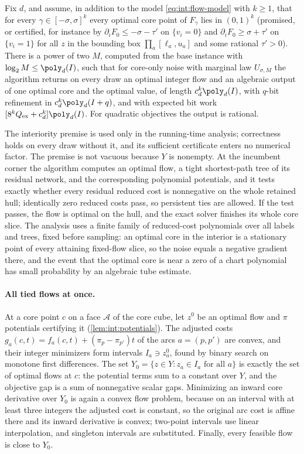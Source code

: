 \begin{theorem}\label{thm:int:flow-interior}
Fix $d$, and assume, in addition to the model \eqref{eq:int:flow-model} with
$k\ge1$, that for every $\gamma\in[-\sigma,\sigma]^k$ every optimal core point
of $F_\gamma$ lies in $(0,1)^k$ (promised, or certified, for instance by
$\partial_iF_0\le-\sigma-\tau'$ on $\{v_i=0\}$ and $\partial_iF_0\ge\sigma+\tau'$
on $\{v_i=1\}$ for all $z$ in the bounding box $\prod_a[\ell_a,u_a]$ and some
rational $\tau'>0$). There is a power of two $M$, computed from the base
instance with $\log_2M\le\poly_d(I)$, such that for core-only noise with
marginal law $U_{\sigma,M}$ the algorithm returns on every draw an optimal
integer flow and an algebraic output of one optimal core and the optimal
value, of length $c_d^k\poly_d(I)$, with $q$-bit refinement in
$c_d^k\poly_d(I+q)$, and with expected bit work
$[8^kQ_{\rm ex}+c_d^k]\poly_d(I)$. For quadratic objectives the output is
rational.
\end{theorem}

The interiority premise is used only in the running-time analysis;
correctness holds on every draw without it, and its sufficient certificate
enters no numerical factor. The premise is not vacuous because $Y$ is
nonempty. At the incumbent corner the algorithm computes an optimal flow, a
tight shortest-path tree of its residual network, and the corresponding
polynomial potentials, and it tests exactly whether every residual reduced
cost is nonnegative on the whole retained hull; identically zero reduced
costs pass, so persistent ties are allowed. If the test passes, the flow is
optimal on the hull, and the exact solver finishes its whole core slice. The
analysis uses a finite family of reduced-cost polynomials over all labels
and trees, fixed before sampling: an optimal core in the interior is a
stationary point of every attaining fixed-flow slice, so the noise equals a
negative gradient there, and the event that the optimal core is near a zero
of a chart polynomial has small probability by an algebraic tube estimate.

\paragraph{All tied flows at once.}
At a core point $c$ on a face $\mathcal A$ of the core cube, let $z^0$ be an
optimal flow and $\pi$ potentials certifying it (\cref{lem:int:potentials}).
The adjusted costs $g_a(c,t)=f_a(c,t)+(\pi_p-\pi_{p'})t$ of the arcs $a=(p,p')$
are convex, and their integer minimizers form intervals $I_a\ni z^0_a$, found
by binary search on monotone first differences. The set
$Y_0=\{z\in Y:z_a\in I_a\text{ for all }a\}$ is exactly the set of optimal flows
at $c$: the potential terms sum to a constant over $Y$, and the objective gap is
a sum of nonnegative scalar gaps. Minimizing an inward core derivative over
$Y_0$ is again a convex flow problem, because on an interval with at least
three integers the adjusted cost is constant, so the original arc cost is
affine there and its inward derivative is convex; two-point intervals use
linear interpolation, and singleton intervals are substituted. Finally, every
feasible flow is close to $Y_0$.

